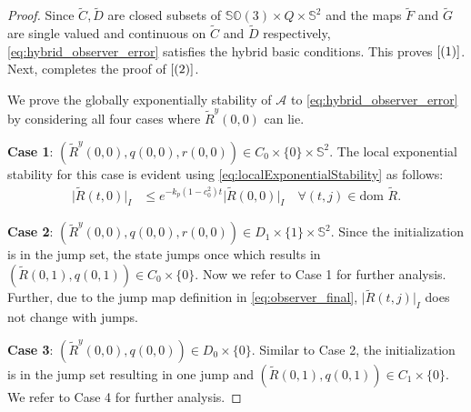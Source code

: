 \documentclass{article}
\newcommand{\dom}{\text{dom }}
\newcommand{\SOthree}{\mathbb{SO}(3)}
\newcommand{\Rtilde}{\tilde{R}}
\newcommand{\normSOthree}[1]{{{\vert}#1 {\vert}_I}}
\newcommand{\expo}[1]{e^{#1}}
\begin{document}
    \begin{proof}
         Since $\tilde{C}, \tilde{D}$ are closed subsets of ${\SOthree\times Q \times \mathbb{S}^2}$ and the maps $\tilde{F}$ and $\tilde{G}$ are single valued and continuous on $\tilde{C}$ and $\tilde{D}$ respectively, \eqref{eq:hybrid_observer_error} satisfies the hybrid basic conditions. This proves $\eqref{(1)}$. Next, \cite[Proposition 6.10]{hybridDynamicalSystems} completes the proof of $\eqref{(2)}$. 
    
  We prove the globally exponentially stability of $\mathcal{A}$ to \eqref{eq:hybrid_observer_error} by considering all four cases where $\Rtilde^y(0,0)$ can lie. 

\textbf{Case 1}: ${(\Rtilde^y(0,0), q(0,0), r(0,0))} \in C_0\times \{0\}\times\mathbb{S}^2$. The local exponential stability for this case is evident using \eqref{eq:localExponentialStability} as follows:
\begin{align}\label{eq:C0bounds}
    \normSOthree{\Rtilde(t,0)} &\leq \expo{-k_p(1-c_0^2)t}\normSOthree{\Rtilde(0,0)} \quad \forall (t,j) \in \dom\Rtilde.
\end{align}

    \textbf{Case 2}: ${(\Rtilde^y(0,0), q(0,0), r(0,0))}\in D_1\times\{1\}\times\mathbb{S}^2$. Since the initialization is in the jump set, the state jumps once which results in ${(\Rtilde(0,1), q(0,1))}\in C_0\times \{0\}$. Now we refer to Case 1 for further analysis. Further, due to the jump map definition in \eqref{eq:observer_final}, $\normSOthree{\Rtilde(t,j)}$ does not change with jumps.

    \textbf{Case 3}: ${(\Rtilde^y(0,0), q(0,0))}\in D_0\times\{0\}$. Similar to Case 2, the initialization is in the jump set resulting in one jump and ${(\Rtilde(0,1), q(0,1))}\in C_1\times\{0\}$. We refer to Case 4 for further analysis.


\end{proof}
\end{document}
